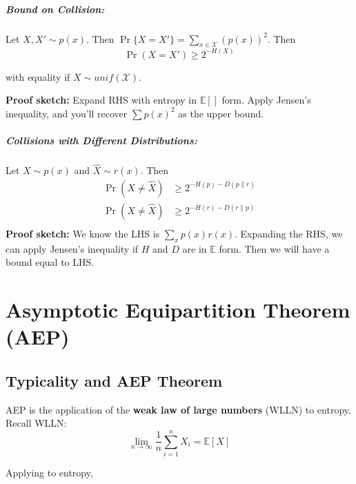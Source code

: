 \documentclass[a4paper,12pt]{report}
\begin{document}
\paragraph{Bound on Collision: } Let $X, X' \sim p(x)$. Then $\Pr\{X = X'\} =
\sum_{x\in \mathcal X}^{} (p(x))^2$. Then \begin{equation}
\Pr(X = X') \geq 2^{-H(X)}
\end{equation}

with equality if $X\sim unif(\mathcal X)$. 

\textbf{Proof sketch:} Expand RHS with entropy in $\mathbb E[]$ form. Apply
Jensen's inequality, and you'll recover $\sum p(x)^2$ as the upper bound. 


\paragraph{Collisions with Different Distributions: } Let $X\sim p(x)$ and
$\hat X \sim r(x)$. Then 
\begin{align}
	\Pr(X\neq \hat X) &\geq 2^{-H(p) - D(p\|r)} \\
	\Pr(X\neq \hat X) &\geq 2^{-H(r) - D(r\|p)} \\
\end{align}
\textbf{Proof sketch:} We know the LHS is $\sum_x p(x)r(x)$. Expanding the RHS,
we can apply Jensen's inequality if $H$ and $D$ are in $\mathbb E$ form. Then we
will have a bound equal to LHS.










\chapter{Asymptotic Equipartition Theorem (AEP)}

\section{Typicality and AEP Theorem}

AEP is the application of the \textbf{weak law of large numbers} (WLLN) to
entropy.  Recall WLLN: 
\begin{equation}
	\label{eqn:wlln}
	\lim_{n\to \infty} \frac{1 }{n} \sum_{i=1}^{n} X_i = \mathbb E[X]
\end{equation}

Applying to entropy, 
\end{document}
